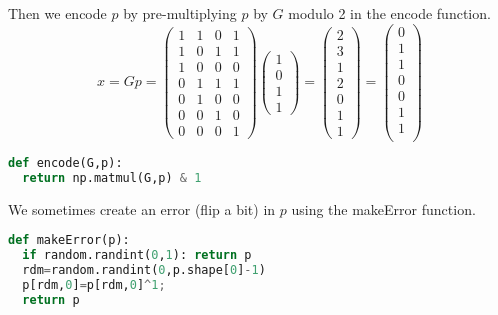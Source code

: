 \documentclass[12pt]{article}
\begin{document}
Then we encode $p$ by pre-multiplying $p$ by $G$ modulo 2 in the encode function.
\[
  x = Gp = 
  \begin{pmatrix}
    1 & 1 & 0 & 1 \\  
    1 & 0 & 1 & 1 \\ 
    1 & 0 & 0 & 0 \\  
    0 & 1 & 1 & 1 \\ 
    0 & 1 & 0 & 0 \\  
    0 & 0 & 1 & 0 \\  
    0 & 0 & 0 & 1 
  \end{pmatrix}
  \begin{pmatrix}
    1 \\
    0 \\
    1 \\
    1
  \end{pmatrix} 
  =
  \begin{pmatrix}
    2 \\
    3 \\
    1 \\
    2 \\
    0 \\
    1 \\
    1
  \end{pmatrix} 
  = 
  \begin{pmatrix}
    0 \\
    1 \\
    1 \\
    0 \\
    0 \\
    1 \\
    1 \\
  \end{pmatrix} 
\]
\begin{lstlisting}[frame=single,language=Python,caption=encode \label{code:makeMessage}]
def encode(G,p):
  return np.matmul(G,p) & 1
\end{lstlisting}

We sometimes create an error (flip a bit) in $p$ using the makeError function.  
\begin{lstlisting}[frame=single,language=Python,caption=makeError \label{code:makeMessage}]
def makeError(p): 
  if random.randint(0,1): return p
  rdm=random.randint(0,p.shape[0]-1)
  p[rdm,0]=p[rdm,0]^1;
  return p
\end{lstlisting}
\end{document}
